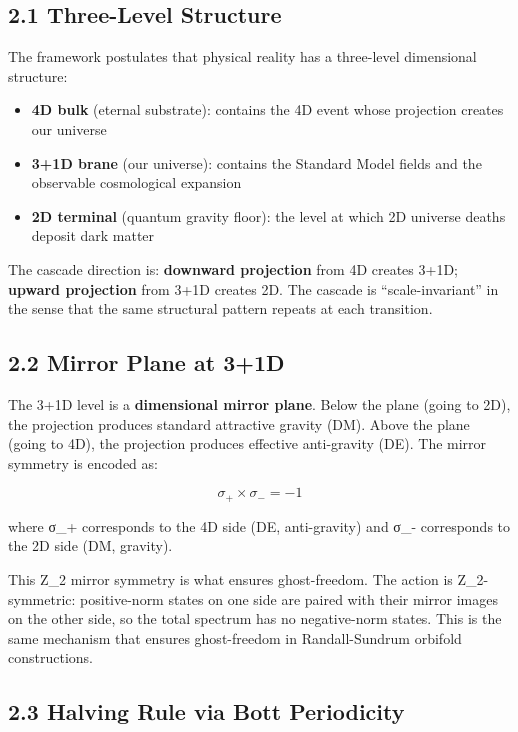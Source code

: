 \documentclass[11pt,a4paper]{article}
\providecommand{\tightlist}{%
  \setlength{\itemsep}{0pt}\setlength{\parskip}{0pt}}
\begin{document}
\hypertarget{three-level-structure}{%
\subsection{2.1 Three-Level Structure}\label{three-level-structure}}

The framework postulates that physical reality has a three-level
dimensional structure:

\begin{itemize}
\tightlist
\item
  \textbf{4D bulk} (eternal substrate): contains the 4D event whose
  projection creates our universe
\item
  \textbf{3+1D brane} (our universe): contains the Standard Model fields
  and the observable cosmological expansion
\item
  \textbf{2D terminal} (quantum gravity floor): the level at which 2D
  universe deaths deposit dark matter
\end{itemize}

The cascade direction is: \textbf{downward projection} from 4D creates
3+1D; \textbf{upward projection} from 3+1D creates 2D. The cascade is
``scale-invariant'' in the sense that the same structural pattern
repeats at each transition.

\hypertarget{mirror-plane-at-31d}{%
\subsection{2.2 Mirror Plane at 3+1D}\label{mirror-plane-at-31d}}

The 3+1D level is a \textbf{dimensional mirror plane}. Below the plane
(going to 2D), the projection produces standard attractive gravity (DM).
Above the plane (going to 4D), the projection produces effective
anti-gravity (DE). The mirror symmetry is encoded as:

\[\sigma_+ \times \sigma_- = -1\]

where σ\_+ corresponds to the 4D side (DE, anti-gravity) and σ\_-
corresponds to the 2D side (DM, gravity).

This Z\_2 mirror symmetry is what ensures ghost-freedom. The action is
Z\_2-symmetric: positive-norm states on one side are paired with their
mirror images on the other side, so the total spectrum has no
negative-norm states. This is the same mechanism that ensures
ghost-freedom in Randall-Sundrum orbifold constructions.

\hypertarget{halving-rule-via-bott-periodicity}{%
\subsection{2.3 Halving Rule via Bott
Periodicity}\label{halving-rule-via-bott-periodicity}}
\end{document}
